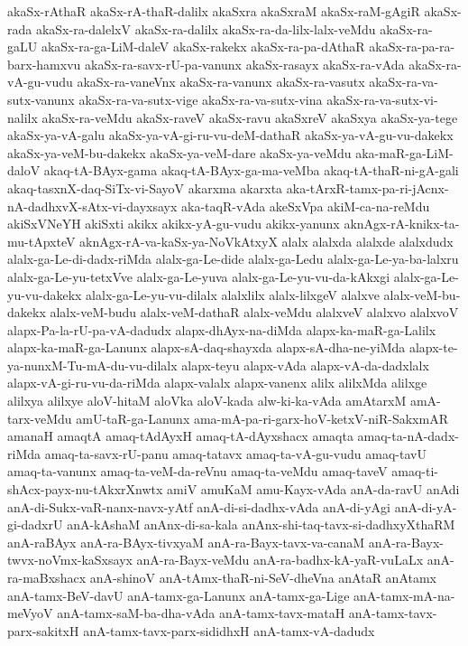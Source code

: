{akaSx-rAthaR
akaSx-rA-thaR-dalilx
akaSxra
akaSxraM
akaSx-raM-gAgiR
akaSx-rada
akaSx-ra-dalelxV
akaSx-ra-dalilx
akaSx-ra-da-lilx-lalx-veMdu
akaSx-ra-gaLU
akaSx-ra-ga-LiM-daleV
akaSx-rakekx
akaSx-ra-pa-dAthaR
akaSx-ra-pa-ra-barx-hamxvu
akaSx-ra-savx-rU-pa-vanunx
akaSx-rasayx
akaSx-ra-vAda
akaSx-ra-vA-gu-vudu
akaSx-ra-vaneVnx
akaSx-ra-vanunx
akaSx-ra-vasutx
akaSx-ra-va-sutx-vanunx
akaSx-ra-va-sutx-vige
akaSx-ra-va-sutx-vina
akaSx-ra-va-sutx-vi-nalilx
akaSx-ra-veMdu
akaSx-raveV
akaSx-ravu
akaSxreV
akaSxya
akaSx-ya-tege
akaSx-ya-vA-galu
akaSx-ya-vA-gi-ru-vu-deM-dathaR
akaSx-ya-vA-gu-vu-dakekx
akaSx-ya-veM-bu-dakekx
akaSx-ya-veM-dare
akaSx-ya-veMdu
aka-maR-ga-LiM-daloV
akaq-tA-BAyx-gama
akaq-tA-BAyx-ga-ma-veMba
akaq-tA-thaR-ni-gA-gali
akaq-tasxnX-daq-SiTx-vi-SayoV
akarxma
akarxta
aka-tArxR-tamx-pa-ri-jAcnx-nA-dadhxvX-sAtx-vi-dayxsayx
aka-taqR-vAda
akeSxVpa
akiM-ca-na-reMdu
akiSxVNeYH
akiSxti
akikx
akikx-yA-gu-vudu
akikx-yanunx
aknAgx-rA-knikx-ta-mu-tApxteV
aknAgx-rA-va-kaSx-ya-NoVkAtxyX
alalx
alalxda
alalxde
alalxdudx
alalx-ga-Le-di-dadx-riMda
alalx-ga-Le-dide
alalx-ga-Ledu
alalx-ga-Le-ya-ba-lalxru
alalx-ga-Le-yu-tetxVve
alalx-ga-Le-yuva
alalx-ga-Le-yu-vu-da-kAkxgi
alalx-ga-Le-yu-vu-dakekx
alalx-ga-Le-yu-vu-dilalx
alalxlilx
alalx-lilxgeV
alalxve
alalx-veM-bu-dakekx
alalx-veM-budu
alalx-veM-dathaR
alalx-veMdu
alalxveV
alalxvo
alalxvoV
alapx-Pa-la-rU-pa-vA-dadudx
alapx-dhAyx-na-diMda
alapx-ka-maR-ga-Lalilx
alapx-ka-maR-ga-Lanunx
alapx-sA-daq-shayxda
alapx-sA-dha-ne-yiMda
alapx-te-ya-nunxM-Tu-mA-du-vu-dilalx
alapx-teyu
alapx-vAda
alapx-vA-da-dadxlalx
alapx-vA-gi-ru-vu-da-riMda
alapx-valalx
alapx-vanenx
alilx
alilxMda
alilxge
alilxya
alilxye
aloV-hitaM
aloVka
aloV-kada
alw-ki-ka-vAda
amAtarxM
amA-tarx-veMdu
amU-taR-ga-Lanunx
ama-mA-pa-ri-garx-hoV-ketxV-niR-SakxmAR
amanaH
amaqtA
amaq-tAdAyxH
amaq-tA-dAyxshacx
amaqta
amaq-ta-nA-dadx-riMda
amaq-ta-savx-rU-panu
amaq-tatavx
amaq-ta-vA-gu-vudu
amaq-tavU
amaq-ta-vanunx
amaq-ta-veM-da-reVnu
amaq-ta-veMdu
amaq-taveV
amaq-ti-shAcx-payx-nu-tAkxrXnwtx
amiV
amuKaM
amu-Kayx-vAda
anA-da-ravU
anAdi
anA-di-Sukx-vaR-nanx-navx-yAtf
anA-di-si-dadhx-vAda
anA-di-yAgi
anA-di-yA-gi-dadxrU
anA-kAshaM
anAnx-di-sa-kala
anAnx-shi-taq-tavx-si-dadhxyXthaRM
anA-raBAyx
anA-ra-BAyx-tivxyaM
anA-ra-Bayx-tavx-va-canaM
anA-ra-Bayx-twvx-noVmx-kaSxsayx
anA-ra-Bayx-veMdu
anA-ra-badhx-kA-yaR-vuLaLx
anA-ra-maBxshacx
anA-shinoV
anA-tAmx-thaR-ni-SeV-dheVna
anAtaR
anAtamx
anA-tamx-BeV-davU
anA-tamx-ga-Lanunx
anA-tamx-ga-Lige
anA-tamx-mA-na-meVyoV
anA-tamx-saM-ba-dha-vAda
anA-tamx-tavx-mataH
anA-tamx-tavx-parx-sakitxH
anA-tamx-tavx-parx-sididhxH
anA-tamx-vA-dadudx
}
